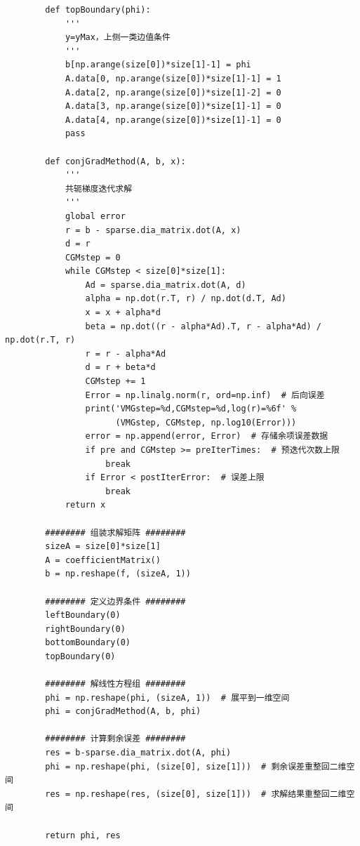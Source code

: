 \documentclass{article} %
\begin{document}
\begin{lstlisting}
        def topBoundary(phi):
            '''
            y=yMax，上侧一类边值条件
            '''
            b[np.arange(size[0])*size[1]-1] = phi
            A.data[0, np.arange(size[0])*size[1]-1] = 1
            A.data[2, np.arange(size[0])*size[1]-2] = 0
            A.data[3, np.arange(size[0])*size[1]-1] = 0
            A.data[4, np.arange(size[0])*size[1]-1] = 0
            pass
    
        def conjGradMethod(A, b, x):
            '''
            共轭梯度迭代求解
            '''
            global error
            r = b - sparse.dia_matrix.dot(A, x)
            d = r
            CGMstep = 0
            while CGMstep < size[0]*size[1]:
                Ad = sparse.dia_matrix.dot(A, d)
                alpha = np.dot(r.T, r) / np.dot(d.T, Ad)
                x = x + alpha*d
                beta = np.dot((r - alpha*Ad).T, r - alpha*Ad) / np.dot(r.T, r)
                r = r - alpha*Ad
                d = r + beta*d
                CGMstep += 1
                Error = np.linalg.norm(r, ord=np.inf)  # 后向误差
                print('VMGstep=%d,CGMstep=%d,log(r)=%6f' %
                      (VMGstep, CGMstep, np.log10(Error)))
                error = np.append(error, Error)  # 存储余项误差数据
                if pre and CGMstep >= preIterTimes:  # 预迭代次数上限
                    break
                if Error < postIterError:  # 误差上限
                    break
            return x
    
        ######## 组装求解矩阵 ########
        sizeA = size[0]*size[1]
        A = coefficientMatrix()
        b = np.reshape(f, (sizeA, 1))
    
        ######## 定义边界条件 ########
        leftBoundary(0)
        rightBoundary(0)
        bottomBoundary(0)
        topBoundary(0)
    
        ######## 解线性方程组 ########
        phi = np.reshape(phi, (sizeA, 1))  # 展平到一维空间
        phi = conjGradMethod(A, b, phi)
    
        ######## 计算剩余误差 ########
        res = b-sparse.dia_matrix.dot(A, phi)
        phi = np.reshape(phi, (size[0], size[1]))  # 剩余误差重整回二维空间
        res = np.reshape(res, (size[0], size[1]))  # 求解结果重整回二维空间
    
        return phi, res
    

\end{lstlisting}
\end{document}
